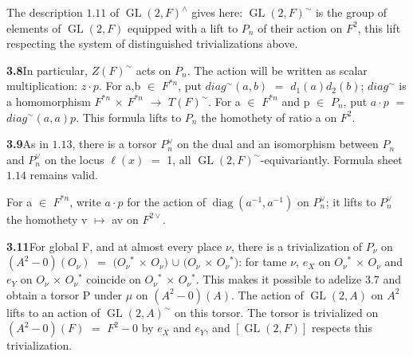 \documentclass[10pt,a4paper]{article}
\begin{document}
\par The description $1.11$ of $\operatorname{GL}(2,F)^\wedge{}$ gives here: $\operatorname{GL}(2,F)^\sim$ is the group of elements of $\operatorname{GL}(2,F)$ equipped with a lift to $P_n$ of their action on $F^2$, this lift respecting the system of distinguished trivializations above.\par
\par\noindent\textbf{3.8}\quad In particular, $Z(F)^\sim$ acts on $P_n$. The action will be written as scalar multiplication: $z\cdot{}p$. For a,b $\in{}$ $F^{*n}$, put $diag^\sim(a,b)$ $=$ $d_1(a)d_2(b)$; $diag^\sim$ is a homomorphism $F^{*n}$ $\times{}$ $F^{*n}$ $\to{}$ $T(F)^\sim$. For a $\in{}$ $F^{*n}$ and p $\in{}$ $P_n$, put $a\cdot{}p$ $=$ $diag^\sim(a,a)p$. This formula lifts to $P_n$ the homothety of ratio a on $F^2$.\par
\par\noindent\textbf{3.9}\quad As in $1.13$, there is a torsor $P_n^\vee{}$ on the dual and an isomorphism between $P_n$ and $P_n^\vee{}$ on the locus $\ell{}(x)$ $=$ 1, all $\operatorname{GL}(2,F)^\sim$-equivariantly. Formula sheet $1.14$ remains valid.\par
\par For a $\in{}$ $F^{*n}$, write $a\cdot{}p$ for the action of $\operatorname{diag}(a^{-1},a^{-1})$ on $P_n^\vee{}$; it lifts to $P_n^\vee{}$ the homothety v $\mapsto{}$ av on $F^{2\vee{}}$.\par
\par\medskip{}\par\smallskip

\clearpage
{}
\label{d035-physical-018}
\par\noindent\textbf{3.11}\quad For global F, and at almost every place $\nu{}$, there is a trivialization of $P_\nu{}$ on $(A^2-{0})(O_\nu{})$ $=$ $(O_\nu{}^*$ $\times{}$ $O_\nu{})$ $\cup{}$ $(O_\nu{}$ $\times{}$ $O_\nu{}^*)$: for tame $\nu{}$, $e_X$ on $O_\nu{}^*$ $\times{}$ $O_\nu{}$ and $e_Y$ on $O_\nu{}$ $\times{}$ $O_\nu{}^*$ coincide on $O_\nu{}^*$ $\times{}$ $O_\nu{}^*$. This makes it possible to adelize $3.7$ and obtain a torsor P under $\mu{}$ on $(A^2-{0})(A)$. The action of $\operatorname{GL}(2,A)$ on $A^2$ lifts to an action of $\operatorname{GL}(2,A)^\sim$ on this torsor. The torsor is trivialized on $(A^2-{0})(F)$ $=$ $F^2-{0}$ by $e_X$ and $e_Y$, and $[\operatorname{GL}(2,F)]$ respects this trivialization.\par
\end{document}

